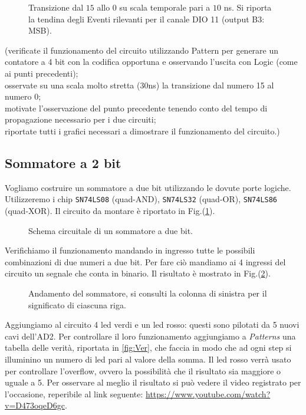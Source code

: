\documentclass[10pt, a4paper, italian]{article}
\begin{document}
\begin{figure}[htb!]
    \centering
    \caption{Transizione dal $15$ allo $0$ su scala temporale pari a $10$ ns. Si riporta la tendina degli Eventi rilevanti per il canale DIO 11 (output B3: MSB).}
\end{figure}
(verificate il funzionamento del circuito utilizzando Pattern per generare un contatore a 4 bit con la codifica opportuna e osservando l’uscita con Logic (come ai punti precedenti);\\
osservate su una scala molto stretta (30ns) la transizione dal numero 15 al numero 0;\\
motivate l’osservazione del punto precedente tenendo conto del tempo di propagazione necessario per i due circuiti;\\
riportate tutti i grafici necessari a dimostrare il funzionamento del circuito.)

\subsection{Sommatore a 2 bit}
Vogliamo costruire un sommatore a due bit utilizzando le dovute porte logiche. Utilizzeremo i chip \texttt{SN74LS08} (quad-AND), \texttt{SN74LS32} (quad-OR), \texttt{SN74LS86} (quad-XOR). Il circuito da montare è riportato in Fig.(\ref{fig:fulladder}).

\begin{figure}[htbp]
    \centering
    \caption{Schema circuitale di un sommatore a due bit.}
    \label{fig:fulladder}
\end{figure}

Verifichiamo il funzionamento mandando in ingresso tutte le possibili combinazioni di due numeri a due bit. Per fare ciò mandiamo ai 4 ingressi del circuito un segnale che conta in binario. Il risultato è mostrato in Fig.(\ref{fig:faAD2}).

\begin{figure}[htbp]
    \centering
    \caption{Andamento del sommatore, si consulti la colonna di sinistra per il significato di ciascuna riga.}
    \label{fig:faAD2}
\end{figure}

Aggiungiamo al circuito 4 led verdi e un led rosso: questi sono pilotati da 5 nuovi cavi dell'AD2. Per controllare il loro funzionamento aggiungiamo a \emph{Patterns} una tabella delle verità, riportata in \ref{fig:Ver}, che faccia in modo che ad ogni step si illuminino un numero di led pari al valore della somma. Il led rosso verrà usato per controllare l'overflow, ovvero la possibilità che il risultato sia maggiore o uguale a 5. Per osservare al meglio il risultato si può vedere il video registrato per l'occasione, reperibile al link seguente: \url{https://www.youtube.com/watch?v=D473oqeD6gc}.
\end{document}
